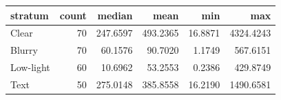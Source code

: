 \begin{tabular}{lrrrrr}
\toprule
stratum & count & median & mean & min & max \\
\midrule
Clear & 70 & 247.6597 & 493.2365 & 16.8871 & 4324.4243 \\
Blurry & 70 & 60.1576 & 90.7020 & 1.1749 & 567.6151 \\
Low-light & 60 & 10.6962 & 53.2553 & 0.2386 & 429.8749 \\
Text & 50 & 275.0148 & 385.8558 & 16.2190 & 1490.6581 \\
\bottomrule
\end{tabular}
